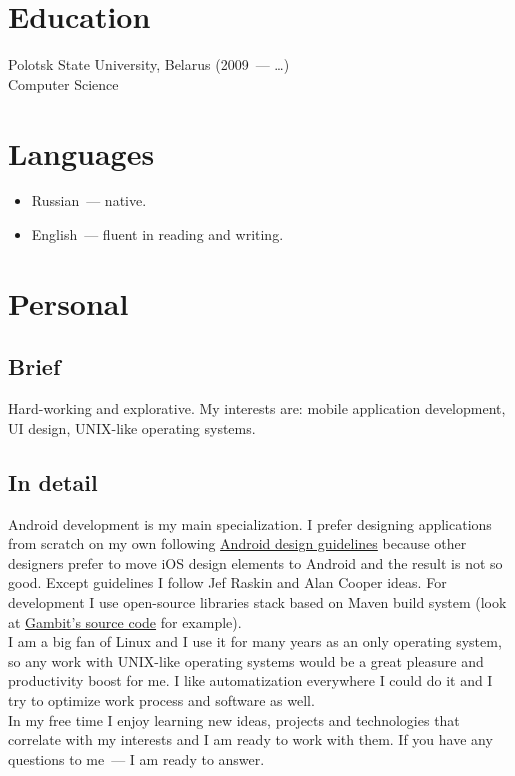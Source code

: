   \section*{Education}

    Polotsk State University, Belarus (2009~--- \dots) \\
    Computer Science


  \section*{Languages}

    \begin{itemize}

      \item Russian~--- native.

      \item English~--- fluent in reading and writing.

    \end{itemize}


  \section*{Personal}

    \subsection*{Brief}

      Hard-working and explorative. My interests are:
      mobile application development, UI design, UNIX-like
      operating systems.

    \subsection*{In detail}

      Android development is my main specialization. I prefer designing
      applications from scratch on my own following
      \href{https://developer.android.com/design/}{Android design guidelines}
      because other designers prefer to move iOS design elements to Android
      and the result is not so good. Except guidelines I follow Jef Raskin
      and Alan Cooper ideas. For development I use open-source libraries
      stack based on Maven build system (look at
      \href{https://github.com/ming13/gambit}{Gambit’s source code} for example). \\

      I am a big fan of Linux and I use it for many years as
      an only operating system, so any work with UNIX-like operating systems
      would be a great pleasure and productivity boost for me.
      I like automatization everywhere I could do it and I try to optimize
      work process and software as well. \\

      In my free time I enjoy learning new ideas, projects and technologies
      that correlate with my interests and I am ready to work with them.
      If you have any questions to me~--- I am ready to answer.

  \vfill


